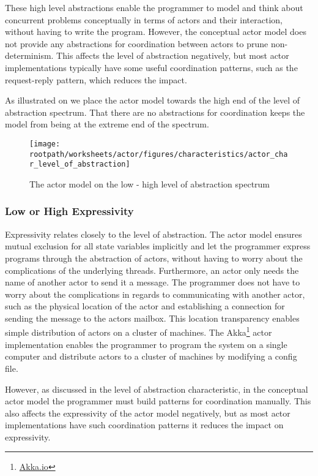 These high level abstractions enable the programmer to model and think about concurrent problems conceptually in terms of actors and their interaction, without having to write the program. However, the conceptual actor model does not provide any abstractions for coordination between actors to prune non-determinism. This affects the level of abstraction negatively, but most actor implementations typically have some useful coordination patterns, such as the request-reply pattern, which reduces the impact.

As illustrated on  we place the actor model towards the high end of the level of abstraction spectrum. That there are no abstractions for coordination keeps the model from being at the extreme end of the spectrum.

\begin{figure}[htbp]
\centering
 \texttt{[image: \\rootpath/worksheets/actor/figures/characteristics/actor\_char\_level\_of\_abstraction]} 
 \caption{The actor model on the low - high level of abstraction spectrum}
\label{fig:actor_level_of_abstraction}
\end{figure}

\subsubsection{Low or High Expressivity}\label{sec:actor_expressivity}
Expressivity relates closely to the level of abstraction. The actor model ensures mutual exclusion for all state variables implicitly and let the programmer express programs through the abstraction of actors, without having to worry about the complications of the underlying threads. Furthermore, an actor only needs the name of another actor to send it a message. The programmer does not have to worry about the complications in regards to communicating with another actor, such as the physical location of the actor and establishing a connection for sending the message to the actors mailbox. This location transparency enables simple distribution of actors on a cluster of machines. The Akka\footnote{\url{Akka.io}} actor implementation enables the programmer to program the system on a single computer and distribute actors to a cluster of machines by modifying a config file\cite[minute 25:45-27:20]{akkaLecture}.

However, as discussed in the level of abstraction characteristic, in the conceptual actor model the programmer must build patterns for coordination manually. This also affects the expressivity of the actor model negatively, but as most actor implementations have such coordination patterns it reduces the impact on expressivity.

